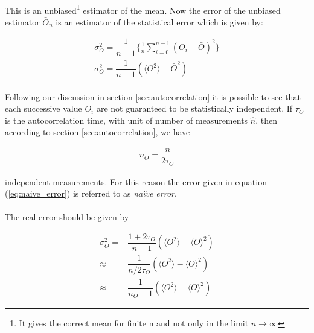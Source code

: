 \documentclass[12pt] {report} %
\begin{document}
				\paragraph{}
					This is an unbiased\footnote{It gives the correct mean for finite n and not only in the limit $n \to \infty$} estimator of the mean. Now the error of the unbiased estimator $\bar{O}_n$ is an estimator of the statistical error which is given by:
					
				\begin{align}
					\sigma_O^2 = \dfrac{1}{n-1} \lbrace \frac{1}{n} \sum_{i=0}^{n-1} (O_i - \bar{O})^2 \rbrace  \nonumber \\
					\sigma_O^2 = \dfrac{1}{n-1} (\langle O^2 \rangle - \bar{O}^2)		\label{eq:naive_error}
				\end{align}
				
			\paragraph{}
				Following our discussion in section \ref{sec:autocorrelation} it is possible to see that each successive value $ O_i $ are not guaranteed to be statistically independent. If $ \tau_O $ is the autocorrelation time, with unit of number of measurements $ \hat{n} $, then according to section \ref{sec:autocorrelation}, we have
				
			\begin{align}
				n_O = \dfrac{n}{2 \tau_O}	\label{eq:number_of_indep_measurements}
			\end{align}  
			
			independent measurements. For this reason the error given in equation (\ref{eq:naive_error}) is referred to as \textit{na\"{i}ve error}.
			
			\paragraph{}
				The real error should be given by 
				
			\begin{align}
				\sigma_O^2 =& \dfrac{1 + 2\tau_O}{n-1} (\langle O^2 \rangle - \langle O \rangle^2) \nonumber\\
				\approx& \dfrac{1}{n/2\tau_O} (\langle O^2 \rangle - \langle O \rangle^2) \nonumber\\
				\approx& \dfrac{1}{n_O-1} (\langle O^2 \rangle - \langle O \rangle^2)	\label{eq:indep_error}
			\end{align}
			
\end{document}
